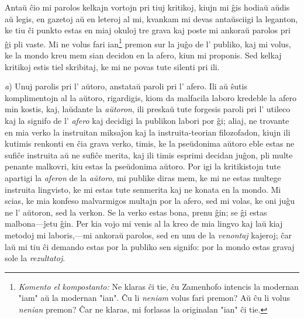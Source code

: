 \titlespacing{\chapter}{0pt}{1em}{1em}


Antaŭ ĉio mi parolos kelkajn vortojn pri tiuj kritikoj, kiujn mi ĝis hodiaŭ aŭdis aŭ legis, en gazetoj aŭ en leteroj al mi, kvankam mi devas antaŭsciigi la leganton, ke tiu ĉi punkto estas en miaj okuloj tre grava kaj poste mi ankoraŭ parolos pri ĝi pli vaste. Mi ne volus fari ian\footnote{\emph{Komento el kompostanto:} Ne klaras ĉi tie, ĉu Zamenhofo intencis la modernan "iam" aŭ la modernan "ian".  Ĉu li \emph{neniam} volus fari premon?  Aŭ ĉu li volus \emph{nenian} premon?  Ĉar ne klaras, mi forlasas la originalan "ian" ĉi tie.} premon sur la juĝo de l' publiko, kaj mi volus, ke la mondo kreu mem sian decidon en la afero, kiun mi proponis. Sed kelkaj kritikoj estis tiel skribitaj, ke mi ne povas tute silenti pri ili.

\emph{a}) Unuj parolis pri l' aŭtoro, anstataŭ paroli pri l' afero. Ili aŭ ŝutis komplimentojn al la aŭtoro, rigardigis, kiom da malfacila laboro kredeble la afero min kostis, kaj, laŭdante la \emph{aŭtoron}, ili preskaŭ tute forgesis paroli pri l' utileco kaj la signifo de l' \emph{afero} kaj decidigi la publikon labori por ĝi; aliaj, ne trovante en mia verko la instruitan miksaĵon kaj la instruita-teorian filozofadon, kiujn ili kutimis renkonti en ĉia grava verko, timis, ke la pseŭdonima aŭtoro eble estas ne sufiĉe instruita aŭ ne sufiĉe merita, kaj ili timis esprimi decidan juĝon, pli multe penante malkovri, kiu estas la pseŭdonima aŭtoro. Por igi la kritikistojn tute apartigi la \emph{aferon} de la \emph{aŭtoro}, mi publike diras mem, ke mi ne estas multege instruita lingvisto, ke mi estas tute senmerita kaj ne konata en la mondo. Mi scias, ke mia konfeso malvarmigos multajn por la afero, sed mi volas, ke oni juĝu ne l' aŭtoron, sed la verkon. Se la verko estas bona, prenu ĝin; se ĝi estas malbona---ĵetu ĝin. Per kia vojo mi venis al la kreo de mia lingvo kaj laŭ kiaj metodoj mi laboris,---mi ankoraŭ parolos, sed en unu de la \emph{venontaj} kajeroj; ĉar laŭ mi tiu ĉi demando estas por la publiko sen signifo: por la mondo estas gravaj sole la \emph{rezultatoj}.

